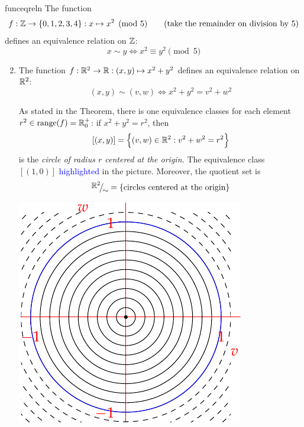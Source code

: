\begin{examples}{}{funceqreln}
	\exstart The function
	\[
		f:\mathbb{Z}\to\{0,1,2,3,4\}:x\mapsto x^2\pmod 5 \tag{take the remainder on division by 5}
	\]
	defines an equivalence relation on $\mathbb{Z}$:
	\[
		x\sim y\iff x^2\equiv y^2\pmod 5
	\]
	\begin{enumerate}\setcounter{enumi}{1}
		\item\label{ex:equivcircle} The function $f:\mathbb{R}^2\to\mathbb{R}:(x,y)\mapsto x^2+y^2$ defines an equivalence relation\footnotemark{} on $\mathbb{R}^2$:
		\[
			(x,y)\sim(v,w)\iff x^2+y^2=v^2+w^2
		\]
		\begin{minipage}[t]{0.67\linewidth}\vspace{-10pt}
			As stated in the Theorem, there is one equivalence classes for each element $r^2\in\operatorname{range}(f)=\mathbb{R}^+_0$: if $x^2+y^2=r^2$, then
			\[
		  	[(x,y)]=\Bigl\{(v,w)\in\mathbb{R}^2:v^2+w^2=r^2\Bigr\}
			\]
			is the \emph{circle of radius $r$ centered at the origin.} The equivalence class $[(1,0)]$ \textcolor{blue}{highlighted} in the picture. Moreover, the quotient set is
			\[
				\quotient{\R^2}{\sim}=\{\text{circles centered at the origin}\}
			\]
		\end{minipage}
		\hfill
		\begin{minipage}[t]{0.3\linewidth}\vspace{-20pt}
			\hfill
			\includegraphics{relations-24-circles}
		\end{minipage}
	\end{enumerate}
	
\end{examples}


